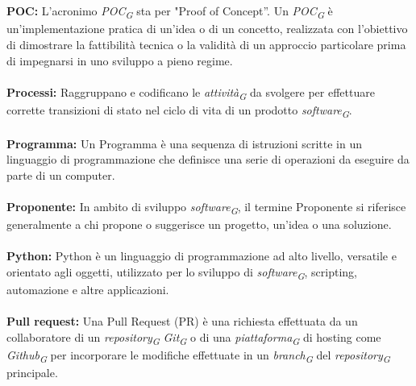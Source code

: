\documentclass{article}
\begin{document}
\\
\\
\textbf{POC:} L'acronimo \textit{POC}\textsubscript{\textit{G}} sta per "Proof of Concept”. Un \textit{POC}\textsubscript{\textit{G}} è un'implementazione pratica di un'idea o di un concetto, realizzata con l'obiettivo di dimostrare la fattibilità tecnica o la validità di un approccio particolare prima di impegnarsi in uno sviluppo a pieno regime.
\\
\\
\textbf{Processi:} Raggruppano e codificano le \textit{attività}\textsubscript{\textit{G}} da svolgere per effettuare corrette transizioni di stato nel ciclo di vita di un prodotto \textit{software}\textsubscript{\textit{G}}.
\\
\\
\textbf{Programma:} Un Programma è una sequenza di istruzioni scritte in un linguaggio di programmazione che definisce una serie di operazioni da eseguire da parte di un computer.
\\
\\
\textbf{Proponente:} In ambito di sviluppo \textit{software}\textsubscript{\textit{G}}, il termine Proponente si riferisce generalmente a chi propone o suggerisce un progetto, un'idea o una soluzione.
\\
\\
\textbf{Python:} Python è un linguaggio di programmazione ad alto livello, versatile e orientato agli oggetti, utilizzato per lo sviluppo di \textit{software}\textsubscript{\textit{G}}, scripting, automazione e altre applicazioni.
\\
\\
\textbf{Pull request:} Una Pull Request (PR) è una richiesta effettuata da un collaboratore di un \textit{repository}\textsubscript{\textit{G}} \textit{Git}\textsubscript{\textit{G}} o di una \textit{piattaforma}\textsubscript{\textit{G}} di hosting come \textit{Github}\textsubscript{\textit{G}} per incorporare le modifiche effettuate in un \textit{branch}\textsubscript{\textit{G}} del \textit{repository}\textsubscript{\textit{G}} principale.
\pagebreak
\end{document}
